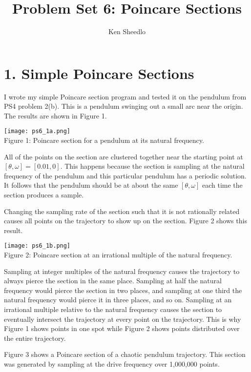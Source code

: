 \documentclass[12pt, letterpaper]{article}
\title{Problem Set 6: Poincare Sections}
\author{Ken Sheedlo}
\begin{document}
\maketitle{}

\section*{1. Simple Poincare Sections}

I wrote my simple Poincare section program and tested it on the pendulum from
PS4 problem 2(b). This is a pendulum swinging out a small arc near the origin.
The results are shown in Figure 1.

\begin{center}
\texttt{[image: ps6\_1a.png]}
\\
Figure 1: Poincare section for a pendulum at its natural frequency.
\end{center}

All of the points on the section are clustered together near the starting point
at $[\theta, \omega] = [0.01, 0]$. This happens because the section is sampling
at the natural frequency of the pendulum and this particular pendulum has a 
periodic solution. It follows that the pendulum should be at about the same 
$[\theta, \omega]$ each time the section produces a sample.

Changing the sampling rate of the section such that it is not rationally related
causes all points on the trajectory to show up on the section. Figure 2 shows 
this result.

\begin{center}
\texttt{[image: ps6\_1b.png]}
\\
Figure 2: Poincare section at an irrational multiple of the natural frequency.
\end{center}

Sampling at integer multiples of the natural frequency causes the trajectory to
always pierce the section in the same place. Sampling at half the natural 
frequency would pierce the section in two places, and sampling at one third the
natural frequency would pierce it in three places, and so on. Sampling at an
irrational multiple relative to the natural frequency causes the section to
eventually intersect the trajectory at every point on the trajectory. This is 
why Figure 1 shows points in one spot while Figure 2 shows points distributed 
over the entire trajectory.

Figure 3 shows a Poincare section of a chaotic pendulum trajectory. This section
was generated by sampling at the drive frequency over 1,000,000 points.
\end{document}
